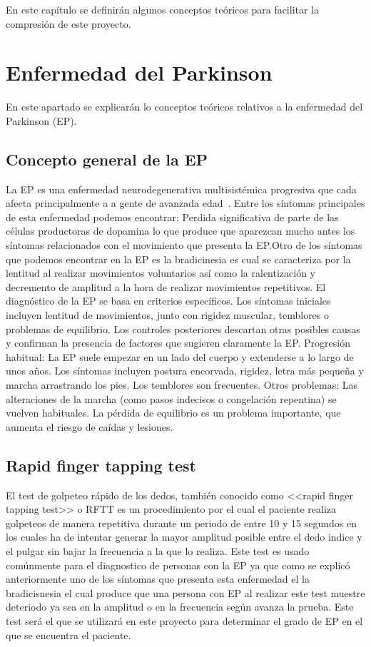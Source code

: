 
En este capítulo se definirán algunos conceptos teóricos para facilitar la compresión de este proyecto.

\section{Enfermedad del Parkinson}

En este apartado se explicarán lo conceptos teóricos relativos a la enfermedad del Parkinson (EP).
\subsection{Concepto general de la EP}
La EP es una  enfermedad neurodegenerativa multisistémica progresiva que cada afecta principalmente a a gente de avanzada edad~\cite{pdsymptoms}.  
Entre los síntomas principales de esta enfermedad podemos encontrar:
Perdida significativa de parte de las células productoras de dopamina lo que produce que aparezcan mucho antes los síntomas relacionados con el movimiento que presenta la EP.Otro de los síntomas que podemos encontrar en la EP es la bradicinesia es cual se caracteriza por la lentitud al realizar movimientos voluntarios así como la ralentización y decremento de amplitud a la hora de realizar movimientos repetitivos.
El diagnóstico de la EP se basa en criterios específicos. Los síntomas iniciales incluyen lentitud de movimientos, junto con rigidez muscular, temblores o problemas de equilibrio. Los controles posteriores descartan otras posibles causas y confirman la presencia de factores que sugieren claramente la EP.
Progresión habitual: La EP suele empezar en un lado del cuerpo y extenderse a lo largo de unos años. Los síntomas incluyen postura encorvada, rigidez, letra más pequeña y marcha arrastrando los pies. Los temblores son frecuentes.
Otros problemas: Las alteraciones de la marcha (como pasos indecisos o congelación repentina) se vuelven habituales. La pérdida de equilibrio es un problema importante, que aumenta el riesgo de caídas y lesiones.

\subsection{Rapid finger tapping test}

El test de golpeteo rápido de los dedos, también conocido como <<rapid finger tapping test>> o RFTT es un procedimiento por el cual el paciente realiza golpeteos de manera repetitiva durante un periodo de entre 10 y 15 segundos en los cuales ha de intentar generar la mayor amplitud posible entre el dedo indice y el pulgar sin bajar la frecuencia a la que lo realiza. Este test es usado comúnmente para el diagnostico de personas con la EP ya que como se explicó anteriormente uno de los síntomas que presenta esta enfermedad el la bradicisnesia el cual produce que una persona con EP al realizar este test muestre deteriodo ya sea en la amplitud o en la frecuencia según avanza la prueba. Este test será el que se utilizará en este proyecto para determinar el grado de EP en el que se encuentra el paciente.

